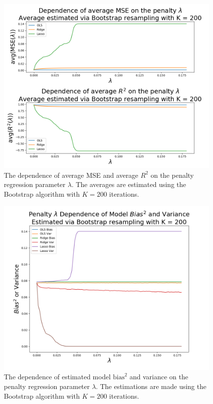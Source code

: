 \documentclass[reprint,english]{revtex4-1}
\begin{document}
\begin{figure}[h]
\centering
\includegraphics[scale=0.3,clip,trim={0cm 0cm 0cm 0cm}]{results/FrankeApprox3/error2_deg5.png}
\caption{The dependence of average MSE and average \(R^2\) on the penalty regression parameter \(\lambda\). The averages are estimated using the Bootstrap algorithm with \(K=200\) iterations.}\label{fig:error_penalty_dependence_resampled2}
\end{figure}

\begin{figure}[h]
\centering
\includegraphics[scale=0.3,clip,trim={0cm 0cm 0cm 0cm}]{results/FrankeApprox3/error3_deg5.png}
\caption{The dependence of estimated model \(\text{bias}^2\) and variance on the penalty regression parameter \(\lambda\). The estimations are made using the Bootstrap algorithm with \(K=200\) iterations.}\label{fig:bias_var_penalty_dependence_resampled2}
\end{figure}
\end{document}

